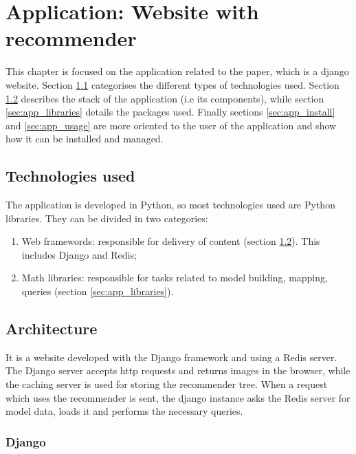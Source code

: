 \chapter{Application: Website with recommender}
\label{chap:app}

This chapter is focused on the application related to the paper, which is a django website. Section \ref{sec:app_technology} categorises the different types of technologies used. Section \ref{sec:app_architecture} describes the stack of the application (i.e its components), while section \ref{sec:app_libraries} details the packages used. Finally sections \ref{sec:app_install} and \ref{sec:app_usage} are more oriented to the user of the application and show how it can be installed and managed.

\section{Technologies used}
\label{sec:app_technology}

The application is developed in Python, so most technologies used are Python libraries. They can be divided in two categories:

\begin{enumerate}
\item{Web framewords: responsible for delivery of content (section \ref{sec:app_architecture}). This includes Django and Redis;}
\item{Math libraries: responsible for tasks related to model building, mapping, queries (section \ref{sec:app_libraries}).}
\end{enumerate}

\section{Architecture}
\label{sec:app_architecture}

It is a website developed with the Django framework and using a Redis server. The Django server accepts http requests and returns images in the browser, while the caching server is used for storing the recommender tree. When a request which uses the recommender is sent, the django instance asks the Redis server for model data, loads it and performs the necessary queries.

\subsection{Django}
\label{subsec:app_architecture_django}

